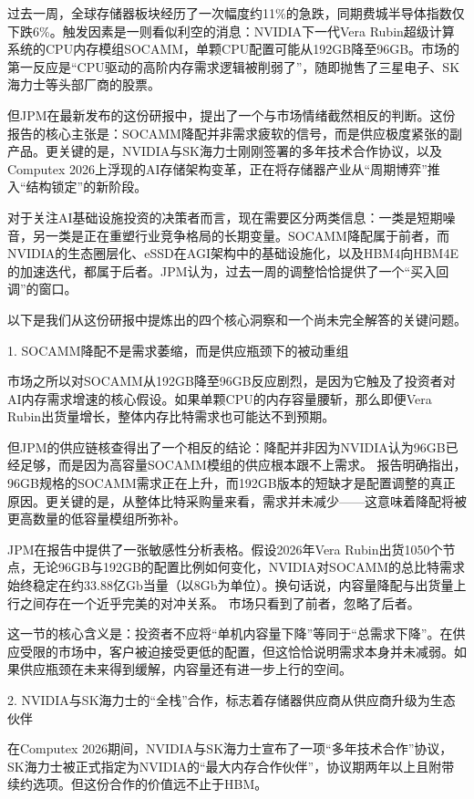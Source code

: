 \documentclass[11pt]{ctexart}
\begin{document}
过去一周，全球存储器板块经历了一次幅度约11\%的急跌，同期费城半导体指数仅下跌6\%。触发因素是一则看似利空的消息：NVIDIA下一代Vera Rubin超级计算系统的CPU内存模组SOCAMM，单颗CPU配置可能从192GB降至96GB。市场的第一反应是“CPU驱动的高阶内存需求逻辑被削弱了”，随即抛售了三星电子、SK海力士等头部厂商的股票。

但JPM在最新发布的这份研报中，提出了一个与市场情绪截然相反的判断。这份报告的核心主张是：SOCAMM降配并非需求疲软的信号，而是供应极度紧张的副产品。更关键的是，NVIDIA与SK海力士刚刚签署的多年技术合作协议，以及Computex 2026上浮现的AI存储架构变革，正在将存储器产业从“周期博弈”推入“结构锁定”的新阶段。

对于关注AI基础设施投资的决策者而言，现在需要区分两类信息：一类是短期噪音，另一类是正在重塑行业竞争格局的长期变量。SOCAMM降配属于前者，而NVIDIA的生态圈层化、eSSD在AGI架构中的基础设施化，以及HBM4向HBM4E的加速迭代，都属于后者。JPM认为，过去一周的调整恰恰提供了一个“买入回调”的窗口。

以下是我们从这份研报中提炼出的四个核心洞察和一个尚未完全解答的关键问题。

1. SOCAMM降配不是需求萎缩，而是供应瓶颈下的被动重组

市场之所以对SOCAMM从192GB降至96GB反应剧烈，是因为它触及了投资者对AI内存需求增速的核心假设。如果单颗CPU的内存容量腰斩，那么即便Vera Rubin出货量增长，整体内存比特需求也可能达不到预期。

但JPM的供应链核查得出了一个相反的结论：降配并非因为NVIDIA认为96GB已经足够，而是因为高容量SOCAMM模组的供应根本跟不上需求。 报告明确指出，96GB规格的SOCAMM需求正在上升，而192GB版本的短缺才是配置调整的真正原因。更关键的是，从整体比特采购量来看，需求并未减少——这意味着降配将被更高数量的低容量模组所弥补。

JPM在报告中提供了一张敏感性分析表格。假设2026年Vera Rubin出货1050个节点，无论96GB与192GB的配置比例如何变化，NVIDIA对SOCAMM的总比特需求始终稳定在约33.88亿Gb当量（以8Gb为单位）。换句话说，内容量降配与出货量上行之间存在一个近乎完美的对冲关系。 市场只看到了前者，忽略了后者。

这一节的核心含义是：投资者不应将“单机内容量下降”等同于“总需求下降”。在供应受限的市场中，客户被迫接受更低的配置，但这恰恰说明需求本身并未减弱。如果供应瓶颈在未来得到缓解，内容量还有进一步上行的空间。

2. NVIDIA与SK海力士的“全栈”合作，标志着存储器供应商从供应商升级为生态伙伴

在Computex 2026期间，NVIDIA与SK海力士宣布了一项“多年技术合作”协议，SK海力士被正式指定为NVIDIA的“最大内存合作伙伴”，协议期两年以上且附带续约选项。但这份合作的价值远不止于HBM。
\end{document}
